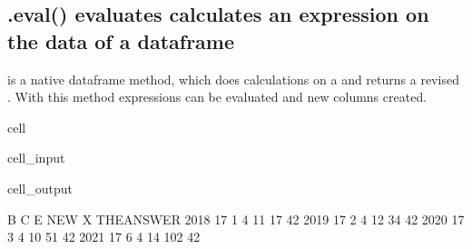 \documentclass[letterpaper,10pt,english]{jupyterBook}
\begin{document}
\subsection{.eval() evaluates calculates an expression on the data of a dataframe}
\label{\detokenize{content/04_PythonEssentials/PythonPandasDataframes:eval-evaluates-calculates-an-expression-on-the-data-of-a-dataframe}}
\sphinxAtStartPar
{} is a native dataframe method, which does calculations on a  and returns a revised . With this method expressions can be evaluated and new columns created.

\begin{sphinxuseclass}{cell}\begin{sphinxVerbatimInput}

\begin{sphinxuseclass}{cell_input}
\begin{sphinxVerbatim}[commandchars=\\\{\}]
\end{sphinxVerbatim}

\end{sphinxuseclass}\end{sphinxVerbatimInput}
\begin{sphinxVerbatimOutput}

\begin{sphinxuseclass}{cell_output}
\begin{sphinxVerbatim}[commandchars=\\\{\}]
       B  C  E  NEW    X  THE\PYGZus{}ANSWER
2018  17  1  4   11   17          42
2019  17  2  4   12   34          42
2020  17  3  4   10   51          42
2021  17  6  4   14  102          42
\end{sphinxVerbatim}

\end{sphinxuseclass}\end{sphinxVerbatimOutput}

\end{sphinxuseclass}
\end{document}

